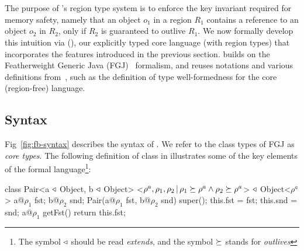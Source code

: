 \section{\fbname}
\label{sec:type-system}

The purpose of \name's region type system is to enforce the key
invariant required for memory safety, namely that an object $o_1$ in a
region $R_1$ contains a reference to an object $o_2$ in $R_2$, only if
$R_2$ is guaranteed to outlive $R_1$. 
We now formally develop this intuition via \fbname (\FB), our
explicitly typed core language (with region types) that incorporates
the features introduced in the previous section. \fbname builds on the
Featherweight Generic Java (FGJ)~\cite{fgj} formalism, and reuses
notations and various definitions from~\cite{fgj}, such as the
definition of type well-formedness for the core (region-free)
language. 


\subsection{Syntax}
\label{sec:fb-syntax}

Fig~\ref{fig:fb-syntax} describes the syntax of \FB.
We refer to the class types of FGJ as \emph{core types}.
%
The following definition of  class in \FB illustrates some
of the key elements of the formal language\footnote{The symbol
$\triangleleft$ should be read \emph{extends}, and the symbol $\succeq$
stands for \emph{outlives}}:
\begin{codejava}[mathescape=true]
class Pair<a $\triangleleft$ Object, b $\triangleleft$ Object>
          <$\rho^a, \rho_1, \rho_2 \,|\, \rho_1 \succeq \rho^a \wedge \rho_2 \succeq \rho^a$> $\triangleleft$ Object<$\rho^a$> {
  a@$\rho_1$ fst; 
  b@$\rho_2$ snd;
  Pair(a@$\rho_1$ fst, b@$\rho_2$ snd) {
    super(); this.fst = fst; this.snd = snd;
  }
  a@$\rho_1$ getFst() { 
    return this.fst; 
  }
}
\end{codejava}
\vspace*{-0.15in}

